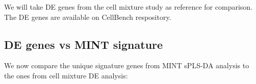 \documentclass[]{book}
\newenvironment{Shaded}{\begin{snugshade}}{\end{snugshade}}
\newcommand{\CommentTok}[1]{\textcolor[rgb]{0.56,0.35,0.01}{\textit{#1}}}
\newcommand{\ControlFlowTok}[1]{\textcolor[rgb]{0.13,0.29,0.53}{\textbf{#1}}}
\newcommand{\KeywordTok}[1]{\textcolor[rgb]{0.13,0.29,0.53}{\textbf{#1}}}
\newcommand{\NormalTok}[1]{#1}
\newcommand{\OperatorTok}[1]{\textcolor[rgb]{0.81,0.36,0.00}{\textbf{#1}}}
\newcommand{\StringTok}[1]{\textcolor[rgb]{0.31,0.60,0.02}{#1}}
\theoremstyle{definition}
\theoremstyle{definition}
\theoremstyle{definition}
\theoremstyle{remark}
\begin{document}
We will take DE genes from the cell mixture study as reference for
comparison. The DE genes are available on CellBench respository.

\begin{Shaded}
\end{Shaded}

\hypertarget{de-genes-vs-mint-signature}{%
\subsection{DE genes vs MINT
signature}\label{de-genes-vs-mint-signature}}

We now compare the unique signature genes from MINT sPLS-DA analysis to
the ones from cell mixture DE analysis:
\end{document}
